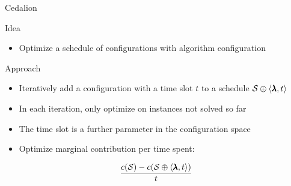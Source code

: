 \begin{frame}[c]{Cedalion~}

\begin{block}{Idea}
\begin{itemize}
\item Optimize a schedule of configurations with algorithm configuration 
\end{itemize}
\end{block}

\medskip
\pause

\begin{block}{Approach}
\begin{itemize}
\item Iteratively add a configuration with a time slot $t$ to a schedule $\mathcal{S} \oplus \langle\pmb{\lambda},t\rangle$
\pause
\item In each iteration, only optimize on instances not solved so far
\item The time slot is a further parameter in the configuration space
\pause
\item Optimize marginal contribution per time spent: 
\end{itemize}

\begin{equation}
\frac{c(\mathcal{S}) - c(\mathcal{S} \oplus \langle\pmb{\lambda},t\rangle)}{t} \nonumber
\end{equation}
\end{block}

\end{frame}
